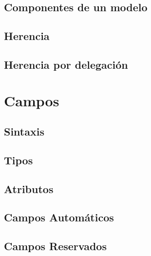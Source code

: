 \documentclass[letterpaper,10pt,spanish]{sphinxmanual}
\begin{document}
\subsection{Componentes de un modelo}
\label{\detokenize{tecnico/orm-api/modelos:componentes-de-un-modelo}}

\subsection{Herencia}
\label{\detokenize{tecnico/orm-api/modelos:herencia}}

\subsection{Herencia por delegación}
\label{\detokenize{tecnico/orm-api/modelos:herencia-por-delegacion}}

\section{Campos}
\label{\detokenize{tecnico/orm-api/campos:campos}}\label{\detokenize{tecnico/orm-api/campos:id1}}\label{\detokenize{tecnico/orm-api/campos::doc}}

\subsection{Sintaxis}
\label{\detokenize{tecnico/orm-api/campos:sintaxis}}

\subsection{Tipos}
\label{\detokenize{tecnico/orm-api/campos:tipos}}

\subsection{Atributos}
\label{\detokenize{tecnico/orm-api/campos:atributos}}

\subsection{Campos Automáticos}
\label{\detokenize{tecnico/orm-api/campos:campos-automaticos}}

\subsection{Campos Reservados}
\label{\detokenize{tecnico/orm-api/campos:campos-reservados}}
\end{document}
